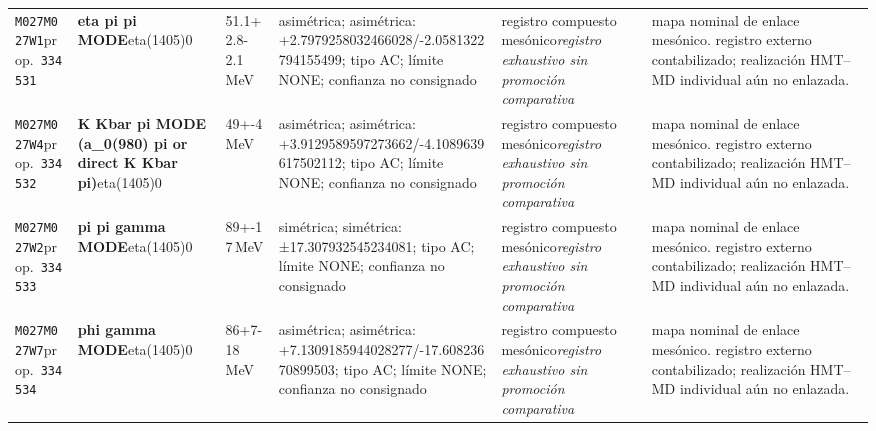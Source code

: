\begin{landscape}
\begin{longtable}{L{1.85cm}L{4.45cm}L{2.35cm}L{4.05cm}L{3.35cm}L{7.15cm}}
\texttt{M027}\newline \texttt{M027W1}\newline prop.\ \texttt{334531} & \textbf{eta pi pi MODE}\newline eta(1405)0 & 51.1+2.8-2.1\,MeV & asimétrica; asimétrica: +2.7979258032466028/-2.0581322794155499; tipo AC; límite NONE; confianza no consignado & registro compuesto mesónico\newline \emph{registro exhaustivo sin promoción comparativa} & mapa nominal de enlace mesónico. registro externo contabilizado; realización HMT--MD individual aún no enlazada. \\
\texttt{M027}\newline \texttt{M027W4}\newline prop.\ \texttt{334532} & \textbf{K Kbar pi MODE (a\_\allowbreak{}0(980) pi or direct K Kbar pi)}\newline eta(1405)0 & 49+-4\,MeV & asimétrica; asimétrica: +3.9129589597273662/-4.1089639617502112; tipo AC; límite NONE; confianza no consignado & registro compuesto mesónico\newline \emph{registro exhaustivo sin promoción comparativa} & mapa nominal de enlace mesónico. registro externo contabilizado; realización HMT--MD individual aún no enlazada. \\
\texttt{M027}\newline \texttt{M027W2}\newline prop.\ \texttt{334533} & \textbf{pi pi gamma MODE}\newline eta(1405)0 & 89+-17\,MeV & simétrica; simétrica: ±17.307932545234081; tipo AC; límite NONE; confianza no consignado & registro compuesto mesónico\newline \emph{registro exhaustivo sin promoción comparativa} & mapa nominal de enlace mesónico. registro externo contabilizado; realización HMT--MD individual aún no enlazada. \\
\texttt{M027}\newline \texttt{M027W7}\newline prop.\ \texttt{334534} & \textbf{phi gamma MODE}\newline eta(1405)0 & 86+7-18\,MeV & asimétrica; asimétrica: +7.1309185944028277/-17.60823670899503; tipo AC; límite NONE; confianza no consignado & registro compuesto mesónico\newline \emph{registro exhaustivo sin promoción comparativa} & mapa nominal de enlace mesónico. registro externo contabilizado; realización HMT--MD individual aún no enlazada. \\

\end{longtable}
\end{landscape}
